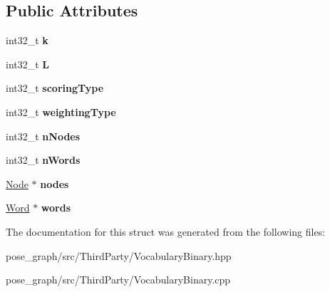 \subsection*{Public Attributes}
\begin{DoxyCompactItemize}
\item 
\mbox{\label{structVINSLoop_1_1Vocabulary_a1890e2666b8cda6bff1aa16eafb13712}} 
int32\+\_\+t {\bfseries k}
\item 
\mbox{\label{structVINSLoop_1_1Vocabulary_a7d346580a72deb89bca1916eb0498850}} 
int32\+\_\+t {\bfseries L}
\item 
\mbox{\label{structVINSLoop_1_1Vocabulary_a8e31cf5c971252276e537f1db765a1a7}} 
int32\+\_\+t {\bfseries scoring\+Type}
\item 
\mbox{\label{structVINSLoop_1_1Vocabulary_a1c77015be9867b8c829054d2debf7a57}} 
int32\+\_\+t {\bfseries weighting\+Type}
\item 
\mbox{\label{structVINSLoop_1_1Vocabulary_a27c876c0d0a15433ef55397c77d5293b}} 
int32\+\_\+t {\bfseries n\+Nodes}
\item 
\mbox{\label{structVINSLoop_1_1Vocabulary_a6f1f8342386ccb711884cc11b7524332}} 
int32\+\_\+t {\bfseries n\+Words}
\item 
\mbox{\label{structVINSLoop_1_1Vocabulary_a35bfe54a42edd557702e8e0733da95b6}} 
\hyperlink{structVINSLoop_1_1Node}{Node} $\ast$ {\bfseries nodes}
\item 
\mbox{\label{structVINSLoop_1_1Vocabulary_a2539079b24f421ae291119505d916868}} 
\hyperlink{structVINSLoop_1_1Word}{Word} $\ast$ {\bfseries words}
\end{DoxyCompactItemize}


The documentation for this struct was generated from the following files\+:\begin{DoxyCompactItemize}
\item 
pose\+\_\+graph/src/\+Third\+Party/Vocabulary\+Binary.\+hpp\item 
pose\+\_\+graph/src/\+Third\+Party/Vocabulary\+Binary.\+cpp\end{DoxyCompactItemize}
